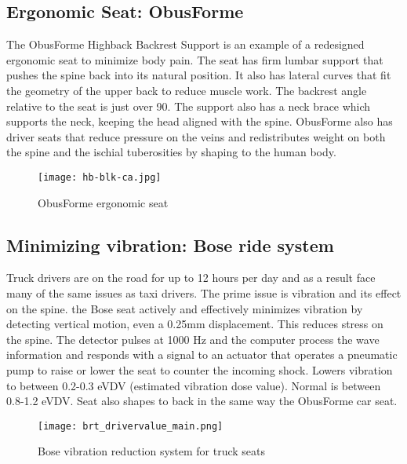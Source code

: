 \documentclass[11pt]{article}
\begin{document}
\subsection{Ergonomic Seat: ObusForme}
The ObusForme Highback Backrest Support is an example of a redesigned ergonomic seat to minimize body pain. 
The seat has firm lumbar support that pushes the spine back into its natural position. 
It also has lateral curves that fit the geometry of the upper back to reduce muscle work\cite{ObusFormebackrest}. 
The backrest angle relative to the seat is just over 90\textdegree. The support also has a neck brace which supports
the neck, keeping the head aligned with the spine\cite{ObusFormedriverchair}.
ObusForme also has driver seats that reduce pressure on the veins and redistributes weight 
on both the spine and the ischial tuberosities by shaping to the human body\cite{ObusFormecushion}.
\begin{figure}[h]
  \centering
  \texttt{[image: hb-blk-ca.jpg]}
  \caption{ObusForme ergonomic seat}
\end{figure}
\subsection{Minimizing vibration: Bose ride system}
Truck drivers are on the road for up to 12 hours per day and as a result face many of the same issues as taxi drivers. 
The prime issue is vibration and its effect on the spine. the Bose seat actively and effectively minimizes vibration 
by detecting vertical motion, even a 0.25mm displacement. This reduces stress on the spine. 
The detector pulses at 1000 Hz and the computer process the 
wave information and responds with a signal to an actuator that operates a pneumatic pump to raise or lower the seat to 
counter the incoming shock. Lowers vibration to between 0.2-0.3 eVDV (estimated vibration dose value). Normal is 
between 0.8-1.2 eVDV\cite{Bosetruckseat}. Seat also shapes to back in the same way the 
ObusForme car seat\cite{Bosetruckseat}.
\begin{figure}[h]
  \centering
  \texttt{[image: brt\_drivervalue\_main.png]}
  \caption{Bose vibration reduction system for truck seats}
\end{figure}
\end{document}
